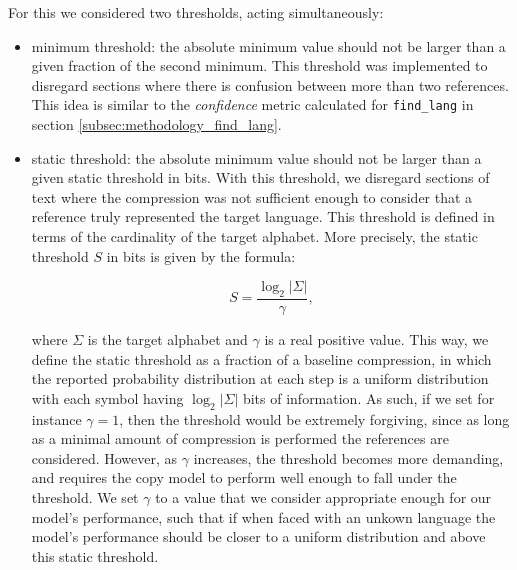 \documentclass{article}
\begin{document}
For this we considered two thresholds, acting simultaneously:
\begin{itemize}
    \item minimum threshold: the absolute minimum value should not be larger than a given fraction of the second minimum. This threshold was implemented to disregard sections where there is confusion between more than two references. This idea is similar to the \textit{confidence} metric calculated for \texttt{find\_lang} in section \ref{subsec:methodology_find_lang}.
    \item static threshold: the absolute minimum value should not be larger than a given static threshold in bits. With this threshold, we disregard sections of text where the compression was not sufficient enough to consider that a reference truly represented the target language.
    This threshold is defined in terms of the cardinality of the target alphabet.
    More precisely, the static threshold $S$ in bits is given by the formula:

    \begin{equation}
        \label{eq:locate_lang_static_threshold}
        S = \frac{\log_2 |\Sigma|}{\gamma},
    \end{equation}

    where $\Sigma$ is the target alphabet and $\gamma$ is a real positive value.
    This way, we define the static threshold as a fraction of a baseline compression, in which the reported probability distribution at each step is a uniform distribution with each symbol having $\log_2 |\Sigma|$ bits of information.
    As such, if we set for instance $\gamma = 1$, then the threshold would be extremely forgiving, since as long as a minimal amount of compression is performed the references are considered.
    However, as $\gamma$ increases, the threshold becomes more demanding, and requires the copy model to perform well enough to fall under the threshold.
    We set $\gamma$ to a value that we consider appropriate enough for our model's performance, such that if when faced with an unkown language the model's performance should be closer to a uniform distribution and above this static threshold.
\end{itemize}
\end{document}
